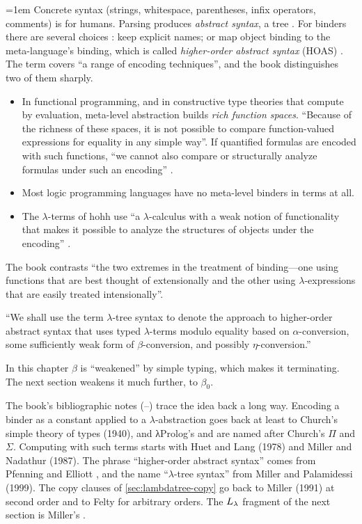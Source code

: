 {{{{{{{\emergencystretch=1em
Concrete syntax (strings, whitespace, parentheses, infix operators, comments) is for humans. Parsing produces
\emph{abstract syntax}, a tree . For binders there are several choices : keep explicit names;
or map object binding to the meta-language's binding, which is called \emph{higher-order abstract syntax}
(HOAS) \cite{PfenningElliott1988}. The term covers \enquote{a range of encoding techniques}, and the book
distinguishes two of them sharply.\par}
\begin{itemize}[nosep]\emergencystretch=1em
  \item In functional programming, and in constructive type theories that compute by evaluation, meta-level
        abstraction builds \emph{rich function spaces}. \enquote{Because of the richness of these spaces, it is not
        possible to compare function-valued expressions for equality in any simple way}. If quantified formulas
        are encoded with such functions, \enquote{we cannot also compare or structurally analyze formulas under
        such an encoding} .
  \item Most logic programming languages have no meta-level binders in terms at all.
  \item The $\lambda$-terms of hohh use \enquote{a $\lambda$-calculus with a weak notion of functionality that makes
        it possible to analyze the structures of objects under the encoding} .
\end{itemize}
The book contrasts \enquote{the two extremes in the treatment of binding---one using functions that are best
thought of extensionally and the other using $\lambda$-expressions that are easily treated intensionally}.

\begin{definition}\label{def:lambdatree-lambdatree}
\enquote{We shall use the term $\lambda$-tree syntax to denote the approach to higher-order abstract syntax that uses
typed $\lambda$-terms modulo equality based on $\alpha$-conversion, some sufficiently weak form of
$\beta$-conversion, and possibly $\eta$-conversion.}
\end{definition}
In this chapter $\beta$ is \enquote{weakened} by simple typing, which makes it terminating. The next section
weakens it much further, to $\beta_0$.

The book's bibliographic notes (--) trace the idea back a long way. Encoding a binder as a
constant applied to a $\lambda$-abstraction goes back at least to Church's simple theory of types (1940), and
λProlog's  and  are named after Church's $\Pi$ and $\Sigma$. Computing with such terms
starts with Huet and Lang (1978) and Miller and Nadathur (1987). The phrase \enquote{higher-order abstract
syntax} comes from Pfenning and Elliott \cite{PfenningElliott1988}, and the name \enquote{$\lambda$-tree
syntax} from Miller and Palamidessi (1999). The copy clauses of \cref{sec:lambdatree-copy} go back to Miller
(1991) at second order and to Felty for arbitrary orders. The $L_\lambda$ fragment of the next section is
Miller's \cite{Miller1991}.

}}}}}}
